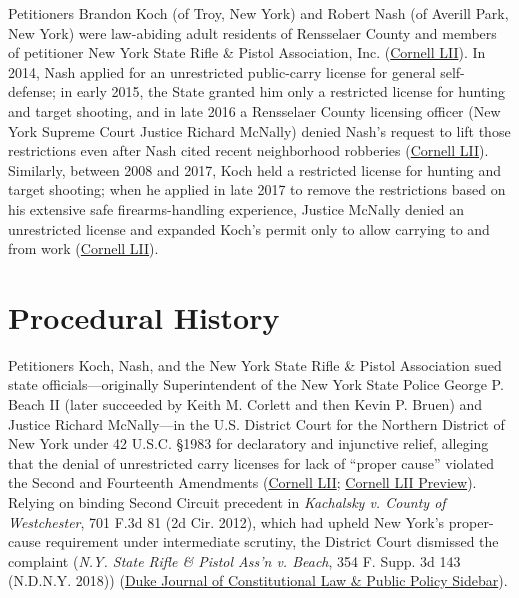 \documentclass[12pt]{article}
\begin{document}
Petitioners Brandon Koch (of Troy, New York) and Robert Nash (of Averill Park, New York) were law-abiding adult residents of Rensselaer County and members of petitioner New York State Rifle \& Pistol Association, Inc. (\href{https://www.law.cornell.edu/supremecourt/text/20-843}{Cornell LII}). In 2014, Nash applied for an unrestricted public-carry license for general self-defense; in early 2015, the State granted him only a restricted license for hunting and target shooting, and in late 2016 a Rensselaer County licensing officer (New York Supreme Court Justice Richard McNally) denied Nash's request to lift those restrictions even after Nash cited recent neighborhood robberies (\href{https://www.law.cornell.edu/supremecourt/text/20-843}{Cornell LII}). Similarly, between 2008 and 2017, Koch held a restricted license for hunting and target shooting; when he applied in late 2017 to remove the restrictions based on his extensive safe firearms-handling experience, Justice McNally denied an unrestricted license and expanded Koch's permit only to allow carrying to and from work (\href{https://www.law.cornell.edu/supremecourt/text/20-843}{Cornell LII}).

\section{Procedural History}

Petitioners Koch, Nash, and the New York State Rifle \& Pistol Association sued state officials---originally Superintendent of the New York State Police George P. Beach II (later succeeded by Keith M. Corlett and then Kevin P. Bruen) and Justice Richard McNally---in the U.S. District Court for the Northern District of New York under 42 U.S.C. \S 1983 for declaratory and injunctive relief, alleging that the denial of unrestricted carry licenses for lack of ``proper cause'' violated the Second and Fourteenth Amendments (\href{https://www.law.cornell.edu/supremecourt/text/20-843}{Cornell LII}; \href{https://www.law.cornell.edu/supct/cert/20-843}{Cornell LII Preview}). Relying on binding Second Circuit precedent in \textit{Kachalsky v. County of Westchester}, 701 F.3d 81 (2d Cir. 2012), which had upheld New York's proper-cause requirement under intermediate scrutiny, the District Court dismissed the complaint (\textit{N.Y. State Rifle \& Pistol Ass'n v. Beach}, 354 F. Supp. 3d 143 (N.D.N.Y. 2018)) (\href{https://scholarship.law.duke.edu/cgi/viewcontent.cgi?article=1212&context=djclpp_sidebar}{Duke Journal of Constitutional Law \& Public Policy Sidebar}).
\end{document}
